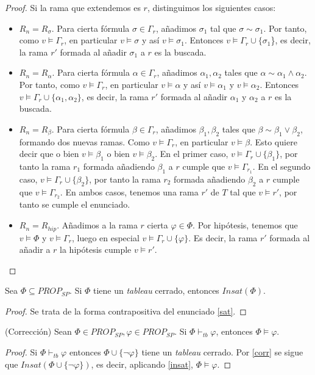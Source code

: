 \begin{proof}
Si la rama que extendemos es $r$, distinguimos los siguientes casos:
\begin{itemize}
    \item $R_n = R_\sigma$. Para cierta fórmula $\sigma \in \Gamma_r$, añadimos $\sigma_1$ tal que $\sigma \sim \sigma_1$. Por tanto, como $v \vDash \Gamma_r$, en particular $v \vDash \sigma$ y así $v \vDash \sigma_1$. Entonces $v \vDash \Gamma_r\cup \{\sigma_1$\}, es decir, la rama $r'$ formada al añadir $\sigma_1$ a $r$ es la buscada.
    \item $R_n = R_\alpha$. Para cierta fórmula $\alpha \in \Gamma_r$, añadimos $\alpha_1, \alpha_2$ tales que $\alpha \sim  \alpha_1 \land \alpha_2$. Por tanto, como $v \vDash \Gamma_r$, en particular $v \vDash \alpha$ y así $v \vDash \alpha_1$ y $v \vDash \alpha_2$. Entonces $v \vDash \Gamma_r\cup\{\alpha_1, \alpha_2\}$, es decir, la rama $r'$ formada al añadir $\alpha_1$ y $\alpha_2$ a $r$ es la buscada.
    \item $R_n = R_\beta$. Para cierta fórmula $\beta\in\Gamma_r$, añadimos  $\beta_1,\beta_2$ tales que $\beta \sim \beta_1\lor\beta_2$, formando dos nuevas ramas. Como $v\vDash\Gamma_r$, en particular $v \vDash\beta$. Esto quiere decir que o bien $v\vDash\beta_1$ o bien $v\vDash\beta_2$. En el primer caso, $v\vDash\Gamma_r\cup\{\beta_1\}$, por tanto la rama $r_1$ formada añadiendo $\beta_1$ a $r$ cumple que $v\vDash\Gamma_{r_1}$. En el segundo caso, $v\vDash\Gamma_r\cup\{\beta_2\}$, por tanto la rama $r_2$ formada añadiendo $\beta_2$ a $r$ cumple que $v\vDash\Gamma_{r_2}$. En ambos casos, tenemos una rama $r'$ de $T$ tal que $v\vDash r'$, por tanto se cumple el enunciado.
    \item $R_n = R_{hip}$. Añadimos a la rama $r$ cierta $\varphi \in \Phi$. Por hipótesis, tenemos que $v \vDash \Phi$ y $v \vDash \Gamma_r$, luego en especial $v \vDash \Gamma_r\cup\{\varphi\}$. Es decir, la rama $r'$ formada al añadir a $r$ la hipótesis cumple $v\vDash r'$.
\end{itemize}
\end{proof}

\begin{cor}\label{corr}
Sea $\Phi \subseteq PROP_{SP}$. Si $\Phi$ tiene un \textit{tableau} cerrado, entonces $Insat(\Phi)$.
\end{cor}
\begin{proof}
Se trata de la forma contrapositiva del enunciado \ref{sat}.
\end{proof}

\begin{cor}(Corrección)\label{corrección}
Sean $\Phi \in PROP_{SP}, \varphi \in PROP_{SP}$. Si $\Phi \vdash_{tb} \varphi$, entonces $\Phi \vDash \varphi$.
\end{cor}
\begin{proof}
Si $\Phi \vdash_{tb} \varphi$ entonces $\Phi \cup \{\neg \varphi\}$ tiene un \textit{tableau} cerrado. Por \ref{corr} se sigue que $Insat(\Phi \cup \{\neg \varphi \})$, es decir,  aplicando \ref{insat}, $\Phi \vDash \varphi$.
\end{proof}

